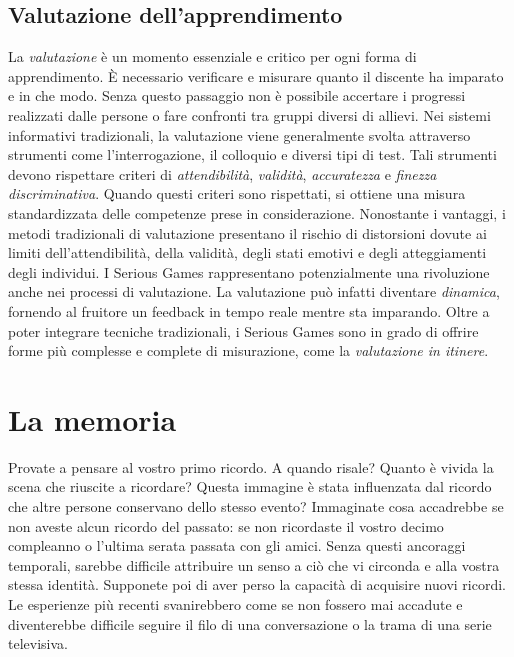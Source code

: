 \documentclass[a4paper]{article}
\begin{document}
\subsection{Valutazione dell'apprendimento}
La \emph{valutazione} è un momento essenziale e critico per ogni forma di apprendimento. È necessario verificare e misurare quanto il discente ha imparato e in che modo. Senza questo passaggio non è possibile accertare i progressi realizzati dalle persone o fare confronti tra gruppi diversi di allievi.
Nei sistemi informativi tradizionali, la valutazione viene generalmente svolta attraverso strumenti come l'interrogazione, il colloquio e diversi tipi di test.
Tali strumenti devono rispettare criteri di \emph{attendibilità}, \emph{validità}, \emph{accuratezza} e \emph{finezza discriminativa}. Quando questi criteri sono rispettati, si ottiene una misura standardizzata delle competenze prese in considerazione.
Nonostante i vantaggi, i metodi tradizionali di valutazione presentano il rischio di distorsioni dovute ai limiti dell'attendibilità, della validità, degli stati emotivi e degli atteggiamenti degli individui.
I Serious Games rappresentano potenzialmente una rivoluzione anche nei processi di valutazione. La valutazione può infatti diventare \emph{dinamica}, fornendo al fruitore un feedback in tempo reale mentre sta imparando.
Oltre a poter integrare tecniche tradizionali, i Serious Games sono in grado di offrire forme più complesse e complete di misurazione, come la \emph{valutazione in itinere}.
\section{La memoria}
Provate a pensare al vostro primo ricordo. A quando risale? Quanto è vivida la scena che riuscite a ricordare? Questa immagine è stata influenzata dal ricordo che altre persone conservano dello stesso evento?
Immaginate cosa accadrebbe se non aveste alcun ricordo del passato: se non ricordaste il vostro decimo compleanno o l'ultima serata passata con gli amici. Senza questi ancoraggi temporali, sarebbe difficile attribuire un senso a ciò che vi circonda e alla vostra stessa identità.
Supponete poi di aver perso la capacità di acquisire nuovi ricordi. Le esperienze più recenti svanirebbero come se non fossero mai accadute e diventerebbe difficile seguire il filo di una conversazione o la trama di una serie televisiva.
\end{document}
